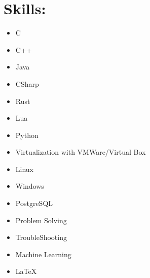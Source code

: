 \documentclass[12pt, oneside, a4paper]{article}
\begin{document}
    \section*{Skills:}
    \begin{itemize}
    \item C
    \item C++
    \item Java
    \item CSharp
    \item Rust
    \item Lua
    \item Python
    \item Virtualization with VMWare/Virtual Box
    \item Linux
    \item Windows
    \item PostgreSQL
    \item Problem Solving
    \item TroubleShooting
    \item Machine Learning
    \item LaTeX
    \end{itemize}
\end{document}
